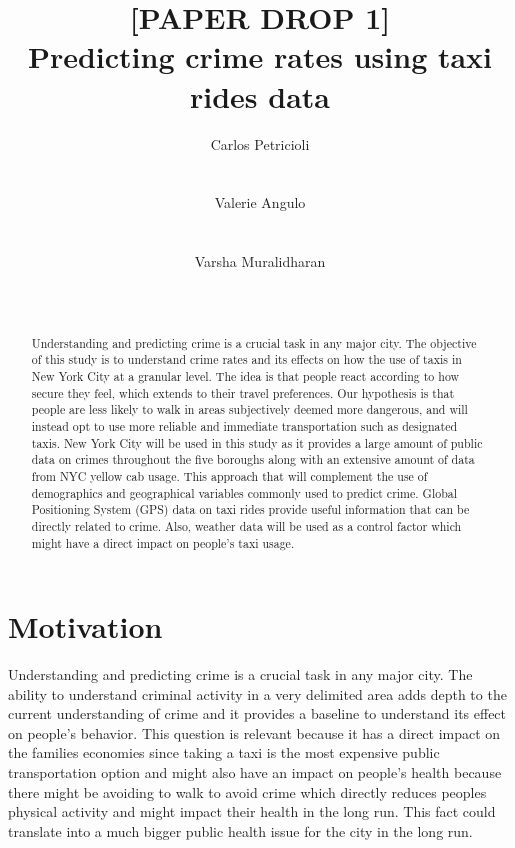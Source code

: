 \documentclass{sigkddExp}
\title{[PAPER DROP 1]\\
Predicting crime rates using taxi rides data}
\author{
\alignauthor Carlos Petricioli \\
       \affaddr{New York University}\\
       \affaddr{New York, USA}\\
       \email{petricioli@nyu.edu}
\alignauthor Valerie Angulo\\
       \affaddr{New York University}\\
       \affaddr{New York, USA}\\
       \email{vaa238@nyu.edu}
\alignauthor Varsha Muralidharan \\
       \affaddr{New York University}\\
       \affaddr{New York, USA}\\
       \email{vm1370@nyu.edu}
}
\begin{document}
\maketitle

\begin{abstract}

Understanding and predicting crime is a crucial task in any major city. The objective of this study is to understand crime rates and its effects on how the use of taxis in New York City at a granular level. The idea  is that people react according to how secure they feel, which extends to their travel preferences. 
Our hypothesis is that people are less likely to walk in areas subjectively deemed more dangerous, and will instead opt to use more reliable and immediate transportation such as designated taxis. 
New York City will be used in this study as it provides a large amount of public data on crimes throughout the five boroughs along with an extensive amount of data from NYC yellow cab usage. 
This approach that will complement the use of demographics and geographical variables commonly used to predict crime. Global Positioning System (GPS) data on taxi rides provide useful information that can be directly related to crime. Also, weather data will be used as a control factor which might have a direct impact on people's taxi usage. 

\end{abstract}




\section{Motivation}

Understanding and predicting crime is a crucial task in any major city. 
The ability to understand criminal activity in a very delimited area adds depth to the current understanding of crime and  it provides a baseline to understand its effect on people's behavior. 
This question is relevant because it has a direct impact on the families economies since taking a taxi is the most expensive public transportation option and might also have an impact on people's health because there might be avoiding to walk to avoid crime which directly reduces peoples physical activity and might impact their health in the long run. 
This fact could translate into a much bigger public health issue for the city in the long run. %
\end{document}
